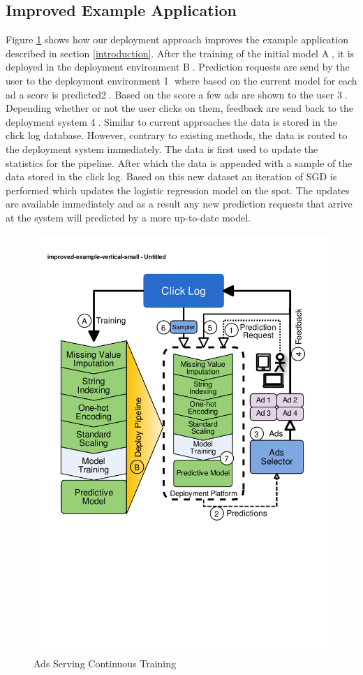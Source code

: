 \subsection{Improved Example Application}
Figure \ref{fig:improved-example} shows how our deployment approach improves the example application described in section \ref{introduction}.
After the training of the initial model \textcircled{A}, it is deployed in the deployment environment \textcircled{B}.
Prediction requests are send by the user to the deployment environment \textcircled{1} where based on the current model for each ad a score is predicted\textcircled{2}.
Based on the score a few ads are shown to the user \textcircled{3}.
Depending whether or not the user clicks on them, feedback are send back to the deployment system \textcircled{4}.
Similar to current approaches the data is stored in the click log database.
However, contrary to existing methods, the data is routed to the deployment system immediately.
The data is first used to update the statistics for the pipeline.
After which the data is appended with a sample of the data stored in the click log.
Based on this new dataset an iteration of SGD is performed which updates the logistic regression model on the spot.
The updates are available immediately and as a result any new prediction requests that arrive at the system will predicted by a more up-to-date model.

\begin{figure}[t]
\centering
\includegraphics[width=\columnwidth]{../images/improved-example.pdf}
\caption{Ads Serving Continuous Training}
\label{fig:improved-example}
\end{figure}

